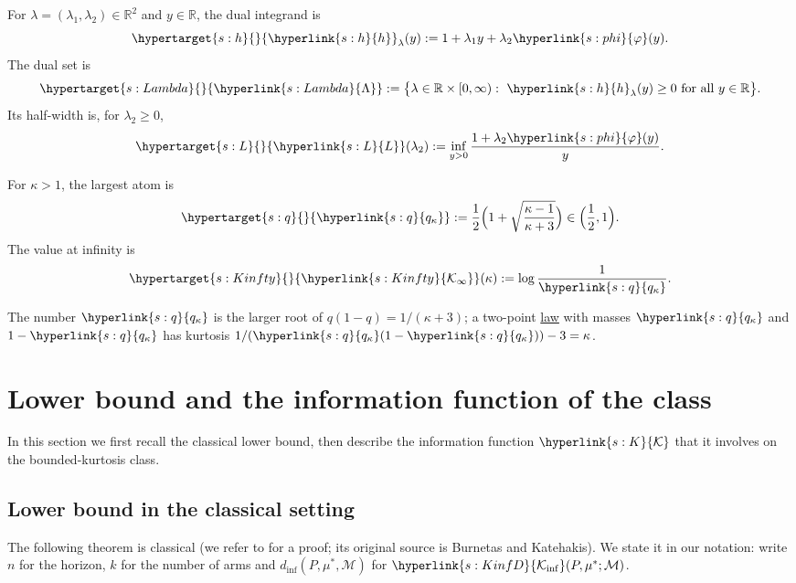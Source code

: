 \documentclass[11pt]{article}
\newcommand{\R}{\mathbb{R}}
\newcommand{\dt}[1]{\hypertarget{#1}{}}
\newcommand{\sy}[2]{{\hyperlink{#1}{#2}}}
\newcommand{\term}[2]{\hyperlink{#1}{#2}}
\newcommand{\Kinf}{\sy{s:KinfD}{\mathcal{K}_{\inf}}}
\newcommand{\Kc}{\sy{s:K}{\mathcal{K}}}
\newcommand{\phik}{\sy{s:phi}{\varphi}}
\newcommand{\hl}{\sy{s:h}{h}}
\newcommand{\Lam}{\sy{s:Lambda}{\Lambda}}
\newcommand{\Lw}{\sy{s:L}{L}}
\newcommand{\qk}{\sy{s:q}{q_{\kappa}}}
\newcommand{\Kinfty}{\sy{s:Kinfty}{\mathcal{K}_{\infty}}}
\begin{document}
\begin{definition}\label{def:dualset}
For $\lambda=(\lambda_1,\lambda_2)\in\R^2$ and $y\in\R$, the dual integrand is
\begin{equation*}
  \dt{s:h}\hl_\lambda(y):=1+\lambda_1y+\lambda_2\phik(y).
\end{equation*}
The dual set is
\begin{equation*}
  \dt{s:Lambda}\Lam:=\bigl\{\lambda\in\R\times[0,\infty):\ \hl_\lambda(y)\ge0\ \text{for all }y\in\R\bigr\}.
\end{equation*}
Its half-width is, for $\lambda_2\ge0$,
\begin{equation*}
  \dt{s:L}\Lw(\lambda_2):=\inf_{y>0}\frac{1+\lambda_2\phik(y)}{y}.
\end{equation*}
\end{definition}

\begin{definition}\label{def:kinfty}
For $\kappa>1$, the largest atom is
\begin{equation*}
  \dt{s:q}\qk:=\frac12\Bigl(1+\sqrt{\frac{\kappa-1}{\kappa+3}}\Bigr)\in\Bigl(\frac12,1\Bigr).
\end{equation*}
The value at infinity is
\begin{equation*}
  \dt{s:Kinfty}\Kinfty(\kappa):=\log\frac1{\qk}.
\end{equation*}
\end{definition}

The number $\qk$ is the larger root of $q(1-q)=1/(\kappa+3)$; a two-point \term{w:law}{law} with masses $\qk$ and
$1-\qk$ has kurtosis $1/(\qk(1-\qk))-3=\kappa$.
\section{Lower bound and the information function of the class}\label{sec:lower}

In this section we first recall the classical lower bound, then describe the information function
$\Kc$ that it involves on the bounded-kurtosis class.

\subsection{Lower bound in the classical setting}

The following theorem is classical (we refer to \citet{LS} for a proof; its original source is
Burnetas and Katehakis). We state it in our notation: \citet{LS} write $n$ for the horizon, $k$ for the
number of arms and $d_{\inf}(P,\mu^*,\mathcal M)$ for $\Kinf(P,\mu^*;\mathcal M)$.
\end{document}
